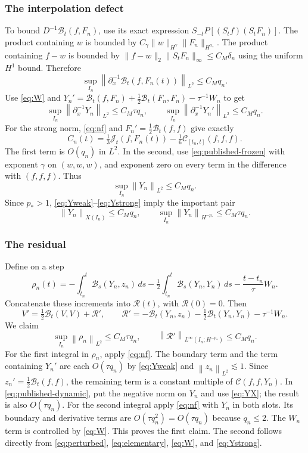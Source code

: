 \documentclass[11pt]{article}
\theoremstyle{remark}\newtheorem{remark}[theorem]{Remark}
\newcommand{\cR}{\mathcal R}
\newcommand{\cC}{\mathcal C}
\newcommand{\cJ}{\mathcal J}
\newcommand{\cB}{\mathcal B}
\newcommand{\norm}[2][]{\left\lVert #2\right\rVert_{#1}}
\newcommand{\ip}{\partial_x^{-1}}
\begin{document}
\subsubsection*{The interpolation defect}
To bound $D^{-1}\cB_t(f,F_n)$, use its exact expression
$S_{-t}P[(S_tf)(S_tF_n)]$. The product containing $w$ is bounded by
$C_\gamma\|w\|_{H^\gamma}\|F_n\|_{H^{a_\gamma}}$.
The product containing $f-w$ is bounded by
$\|f-w\|_2\|S_tF_n\|_\infty\leq C_M\delta_n$ using the uniform
$H^1$ bound. Therefore
\[
\sup_{I_n}\norm[L^2]{\ip\cB_t(f,F_n(t))}\leq C_Mq_n.
\]
Use \eqref{eq:W} and
$Y_n'=\cB_t(f,F_n)+\tfrac12\cB_t(F_n,F_n)-\tau^{-1}W_n$ to get
\begin{equation}\label{eq:Yweak}
\sup_{I_n}\norm[L^2]{\ip Y_n}\leq C_M\tau q_n,
\qquad
\sup_{I_n}\norm[L^2]{\ip Y_n'}\leq C_Mq_n.
\end{equation}
For the strong norm, \eqref{eq:nf} and $F_n'=\frac12\cB_t(f,f)$ give exactly
\[
C_n(t)=\tfrac13\cJ_t(f,F_n(t))-\tfrac16\cC_{[t_n,t]}(f,f,f).
\]
The first term is $O(q_n)$ in $L^2$. In the second, use
\eqref{eq:published-frozen} with exponent $\gamma$ on $(w,w,w)$, and exponent
zero on every term in the difference with $(f,f,f)$. Thus
\begin{equation}\label{eq:Ystrong}
\sup_{I_n}\norm[L^2]{Y_n}\leq C_Mq_n.
\end{equation}
Since $p_*>1$, \eqref{eq:Yweak}--\eqref{eq:Ystrong} imply the important pair
\begin{equation}\label{eq:YX}
\norm[X(I_n)]{Y_n}\leq C_Mq_n,
\qquad \sup_{I_n}\norm[H^{-p_*}]{Y_n}\leq C_M\tau q_n.
\end{equation}

\subsubsection*{The residual}
Define on a step
\[
\rho_n(t)=-\int_{t_n}^t\cB_s(Y_n,z_n)\,ds
-\tfrac12\int_{t_n}^t\cB_s(Y_n,Y_n)\,ds
-\frac{t-t_n}{\tau}W_n.
\]
Concatenate these increments into $\cR(t)$, with $\cR(0)=0$.
Then
\begin{equation}\label{eq:perturbed}
V'=\tfrac12\cB_t(V,V)+\cR',\qquad
\cR'=-\cB_t(Y_n,z_n)-\tfrac12\cB_t(Y_n,Y_n)-\tau^{-1}W_n.
\end{equation}
We claim
\begin{equation}\label{eq:rho}
\sup_{I_n}\norm[L^2]{\rho_n}\leq C_M\tau q_n,
\qquad \norm[L^\infty(I_n;H^{-p_*})]{\cR'}\leq C_Mq_n.
\end{equation}
For the first integral in $\rho_n$, apply \eqref{eq:nf}. The boundary term and
the term containing $Y_n'$ are each $O(\tau q_n)$ by \eqref{eq:Yweak} and
$\norm[L^2]{z_n}\lesssim1$. Since $z_n'=\frac12\cB_t(f,f)$, the remaining
term is a constant multiple of $\cC(f,f,Y_n)$. In
\eqref{eq:published-dynamic}, put the negative norm on $Y_n$ and use
\eqref{eq:YX}; the result is also $O(\tau q_n)$.
For the second integral apply \eqref{eq:nf} with $Y_n$ in both slots. Its boundary
and derivative terms are $O(\tau q_n^2)=O(\tau q_n)$ because $q_n\leq2$.
The $W_n$ term is controlled by \eqref{eq:W}. This proves the first claim.
The second follows directly from \eqref{eq:perturbed}, \eqref{eq:elementary},
\eqref{eq:W}, and \eqref{eq:Ystrong}.
\end{document}
